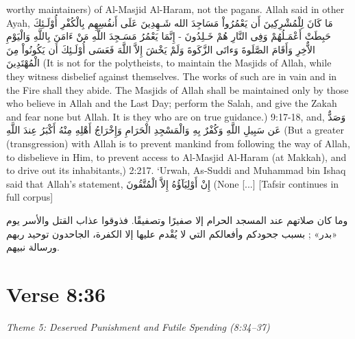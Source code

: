 \documentclass[11pt,a4paper,openany]{book}
\let\textAR\textarabic
\begin{document}
\begin{tafsirbox}
worthy maintainers) of Al-Masjid Al-Haram, not the pagans. Allah said in other Ayah, \textAR{مَا} \textAR{كَانَ} \textAR{لِلْمُشْرِكِينَ} \textAR{أَن} \textAR{يَعْمُرُواْ} \textAR{مَسَاجِدَ} \textAR{الله} \textAR{شَـهِدِينَ} \textAR{عَلَى} \textAR{أَنفُسِهِم} \textAR{بِالْكُفْرِ} \textAR{أُوْلَـئِكَ} \textAR{حَبِطَتْ} \textAR{أَعْمَـلُهُمْ} \textAR{وَفِى} \textAR{النَّارِ} \textAR{هُمْ} \textAR{خَـلِدُونَ} - \textAR{إِنَّمَا} \textAR{يَعْمُرُ} \textAR{مَسَـجِدَ} \textAR{اللَّهِ} \textAR{مَنْ} \textAR{ءَامَنَ} \textAR{بِاللَّهِ} \textAR{وَالْيَوْمِ} \textAR{الاٌّخِرِ} \textAR{وَأَقَامَ} \textAR{الصَّلَوةَ} \textAR{وَءاتَى} \textAR{الزَّكَوةَ} \textAR{وَلَمْ} \textAR{يَخْشَ} \textAR{إِلاَّ} \textAR{اللَّهَ} \textAR{فَعَسَى} \textAR{أُوْلَـئِكَ} \textAR{أَن} \textAR{يَكُونُواْ} \textAR{مِنَ} \textAR{الْمُهْتَدِينَ} (It is not for the polytheists, to maintain the Masjids of Allah, while they witness disbelief against themselves. The works of such are in vain and in the Fire shall they abide. The Masjids of Allah shall be maintained only by those who believe in Allah and the Last Day; perform the Salah, and give the Zakah and fear none but Allah. It is they who are on true guidance.) 9:17-18, and, \textAR{وَصَدٌّ} \textAR{عَن} \textAR{سَبِيلِ} \textAR{اللَّهِ} \textAR{وَكُفْرٌ} \textAR{بِهِ} \textAR{وَالْمَسْجِدِ} \textAR{الْحَرَامِ} \textAR{وَإِخْرَاجُ} \textAR{أَهْلِهِ} \textAR{مِنْهُ} \textAR{أَكْبَرُ} \textAR{عِندَ} \textAR{اللَّهِ} (But a greater (transgression) with Allah is to prevent mankind from following the way of Allah, to disbelieve in Him, to prevent access to Al-Masjid Al-Haram (at Makkah), and to drive out its inhabitants,) 2:217. `Urwah, As-Suddi and Muhammad bin Ishaq said that Allah's statement, \textAR{إِنْ} \textAR{أَوْلِيَآؤُهُ} \textAR{إِلاَّ} \textAR{الْمُتَّقُونَ} (None  [...] [Tafsir continues in full corpus]
\end{tafsirbox}


\begin{muyassarbox}
\textAR{وما كان صلاتهم عند المسجد الحرام إلا صفيرًا وتصفيقًا. فذوقوا عذاب القتل والأسر يوم «بدر» ; بسبب جحودكم وأفعالكم التي لا يُقْدم عليها إلا الكفرة، الجاحدون توحيد ربهم ورسالة نبيهم.}
\end{muyassarbox}


\newpage

\section{Verse 8:36}
{\small\color{accent2}\itshape Theme 5: Deserved Punishment and Futile Spending (8:34--37)}
\end{document}
